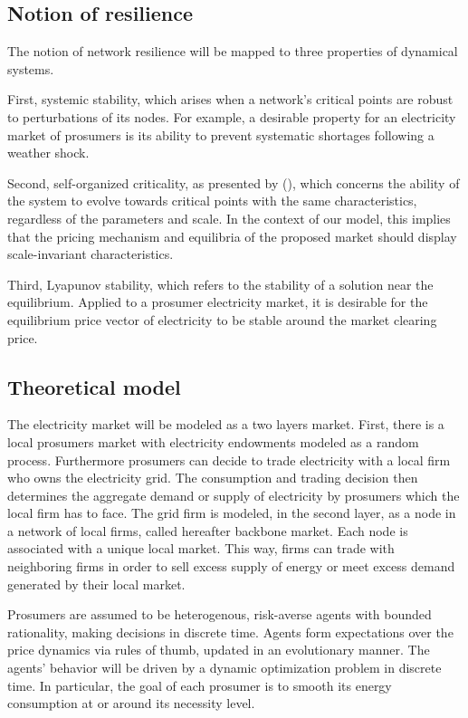 \documentclass[american]{scrartcl}
\begin{document}
\subsection{Notion of resilience}

The notion of network resilience will be mapped to three properties of dynamical systems.

First, systemic stability, which arises when a network's critical points are robust to perturbations of its nodes. For example, a desirable property for an electricity market of prosumers is its ability to prevent systematic shortages following a weather shock.

Second, self-organized criticality, as presented by \citeauthor{Bak1995} (\citeyear{Bak1995}), which concerns the ability of the system to evolve towards critical points with the same characteristics, regardless of the parameters and scale. In the context of our model, this implies that the pricing mechanism and equilibria of the proposed market should display scale-invariant characteristics.

Third, Lyapunov stability, which refers to the stability of a solution near the equilibrium. Applied to a prosumer electricity market, it is desirable for the equilibrium price vector of electricity to be stable around the market clearing price.

\subsection{Theoretical model}

The electricity market will be modeled as a two layers market. First, there is a local prosumers market with electricity endowments modeled as a random process. Furthermore prosumers can decide to trade electricity with a local firm who owns the electricity grid. The consumption and trading decision then determines the aggregate demand or supply of electricity by prosumers which the local firm has to face. The grid firm is modeled, in the second layer, as a node in a network of local firms, called hereafter backbone market. Each node is associated with a unique local market. This way, firms can trade with neighboring firms in order to sell excess supply of energy or meet excess demand generated by their local market.


Prosumers are assumed to be heterogenous, risk-averse agents with bounded rationality, making decisions in discrete time. Agents form expectations over the price dynamics via rules of thumb, updated in an evolutionary manner. The agents' behavior will be driven by a dynamic optimization problem in discrete time. In particular, the goal of each prosumer is to smooth its energy consumption at or around its necessity level.
\end{document}
